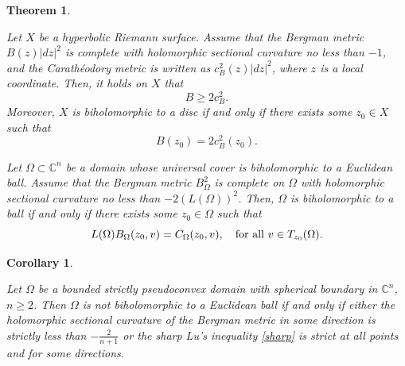 \documentclass[10pt,a4paper]{amsart}
\newtheorem{theorem}{Theorem}
\newtheorem{cor}{Corollary}
\begin{document}
\begin{theorem} \label{rigidity}


 

\item [{$\bf A$.}] Let $X$ be a hyperbolic Riemann surface.
Assume that the Bergman metric $B(z)|dz|^2$ is complete with holomorphic sectional curvature no less than \(-1\), 
and 
the Carath\'eodory metric is written as $c^2_B(z) |dz|^2$,
where $z$ is a local coordinate.
Then, it holds on $X$ that
 $$
{B} \geq   2c^2_B.
 $$
Moreover, $X$ is biholomorphic to a disc if and only if there exists some $z_0 \in X$ such that
$$
B(z_0) =   2 c^2_B(z_0).
$$



 \item [{$\bf B$.}]

Let $\Omega \subset \mathbb{C}^n$ be a  domain whose
  universal cover  is biholomorphic to a Euclidean ball. Assume that  the   Bergman metric $B^2_{\Omega}$  is complete on $\Omega$ with holomorphic sectional curvature no less than $-2(L(\Omega))^2$. Then, $\Omega$ is biholomorphic to a ball  if and only if   there exists some  $z_0 \in \Omega$ such that 
$$
 L(\Omega) B_\Omega (z_0, v) = C_{\Omega} (z_0, v), \quad \text{for all\,} \, v\in T_{z_0}(\Omega). 
$$
   
 

\end{theorem}  

\begin{cor} \label{cor}




{\it Let $\Omega$ be a bounded strictly pseudoconvex domain  with spherical boundary in $\mathbb{C}^n$, $n \geq 2$. Then 
$\Omega$ is not biholomorphic to a Euclidean ball if and only if either the 
holomorphic sectional curvature of the Bergman metric   in some direction is strictly less than 
$-\frac{2}{n+1}$ or the sharp Lu's inequality \eqref{sharp} is strict at all points and for some directions.}



\end{cor}  
\end{document}
